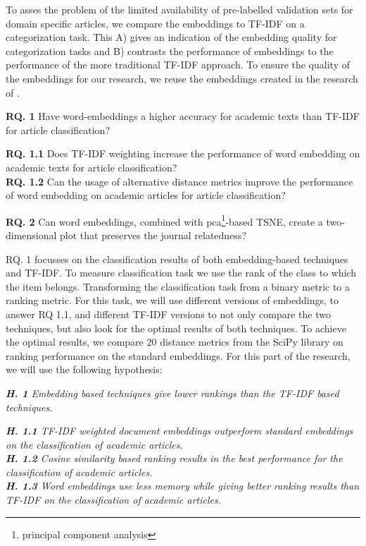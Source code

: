 \documentclass[../../Thesis.tex]{subfiles}
\begin{document}
To asses the problem of the limited availability of pre-labelled validation sets for domain specific articles, we compare the embeddings to  TF-IDF on a categorization task. This A) gives an indication of the embedding quality for categorization tasks and B) contrasts the performance of embeddings to the performance of the more traditional TF-IDF approach. To ensure the quality of the embeddings for our research, we reuse the embeddings created in the research of \citet{Truong2017Thesis}.
\begin{jumpin}
	\textbf{RQ. 1} Have word-embeddings a higher accuracy for academic texts than TF-IDF for article classification?\\
	\begin{adjustwidth}{0.3in}{}
		\textbf{RQ. 1.1} Does TF-IDF weighting increase the performance of word embedding on academic texts for article classification?\\
		\textbf{RQ. 1.2} Can the usage of alternative distance metrics improve the performance of word embedding on academic articles for article classification?
	\end{adjustwidth}
	\vspace{0.1in}\textbf{RQ. 2} Can word embeddings, combined with pca\footnote{principal component analysis}-based TSNE, create a two-dimensional plot that preserves the journal relatedness?
\end{jumpin}
RQ. 1 focusses on the classification results of both embedding-based techniques and TF-IDF.  To measure classification task we use the rank of the class to which the item belongs. Transforming the classification task from a binary metric to a ranking metric. For this task, we will use different versions of embeddings, to answer RQ 1.1, and different TF-IDF versions to not only compare the two techniques, but also look for the optimal results of both techniques. To achieve the optimal results, we compare 20 distance metrics from the SciPy library on ranking performance on the standard embeddings. For this part of the research, we will use the following hypothesis:
\begin{jumpin}
\textit{\textbf{H. 1} Embedding based techniques give lower rankings than the TF-IDF based techniques.}
\begin{jumpin}
\textit{\textbf{H. 1.1} TF-IDF weighted document embeddings outperform standard embeddings on the classification of academic articles.}\\
\textit{\textbf{H. 1.2} Cosine similarity based ranking results in the best performance for the classification of academic articles.}\\
\textit{\textbf{H. 1.3} Word embeddings use less memory while giving better ranking results than TF-IDF on the classification of academic articles.}
\end{jumpin}
\end{jumpin}
\end{document}
